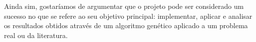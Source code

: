 \documentclass[twoside,conference,a4paper]{IEEEtran}
\begin{document}
Ainda sim, gostaríamos de argumentar que o projeto pode ser considerado um sucesso no que se refere ao seu objetivo principal: implementar, aplicar e analisar os resultados obtidos através de um algoritmo genético aplicado a um problema real ou da literatura.




% 

% 


\end{document}
